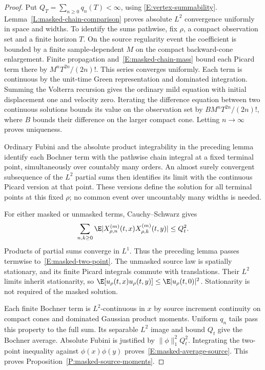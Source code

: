 \begin{proof}
  Put $Q_T=\sum_{n\ge0}q_n(T)<\infty$, using
  \eqref{E:vertex-summability}. Lemma~\ref{L:masked-chain-comparison}
  proves absolute $L^2$ convergence uniformly in space and widths.
  To identify the sums pathwise, fix $\rho$, a compact observation set
  and a finite horizon $T$. On the source regularity event the coefficient
  is bounded by a finite sample-dependent $M$ on the compact backward-cone
  enlargement. Finite propagation and~\eqref{E:masked-chain-mass} bound
  each Picard term there by $M^nT^{2n}/(2n)!$.
  This series converges uniformly. Each term is continuous by the
  unit-time Green representation and dominated integration. Summing the
  Volterra recursion gives the ordinary mild equation with initial
  displacement one and velocity zero. Iterating the difference equation
  between two continuous solutions bounds its value on the observation
  set by $B M^nT^{2n}/(2n)!$, where $B$ bounds their difference on the
  larger compact cone. Letting $n\to\infty$ proves uniqueness.

  Ordinary Fubini and the absolute product integrability in the preceding
  lemma identify each Bochner term with the pathwise chain integral at a
  fixed terminal point, simultaneously over countably many orders.
  An almost surely convergent subsequence of the $L^2$ partial sums then
  identifies its limit with the continuous Picard version at that point.
  These versions define the solution for all terminal points at this
  fixed $\rho$; no common event over uncountably many widths is needed.

  For either masked or unmasked terms, Cauchy--Schwarz gives
  \[
    \sum_{n,k\ge0}\E|X_{\rho,n}^{(m)}(t,x)
    X_{\rho,k}^{(m)}(t,y)|\le Q_t^2.
  \]
  Products of partial sums converge in $L^1$. Thus the preceding
  lemma passes termwise to~\eqref{E:masked-two-point}.
  The unmasked source law is spatially stationary, and its finite
  Picard integrals commute with translations. Their $L^2$ limits inherit
  stationarity, so
  $\E[u_\rho(t,x)u_\rho(t,y)]\le\E|u_\rho(t,0)|^2$.
  Stationarity is not required of the masked solution.

  Each finite Bochner term is $L^2$-continuous in $x$ by source increment
  continuity on compact cones and dominated Gaussian product moments.
  Uniform $q_n$ tails pass this property to the full sum. Its separable
  $L^2$ image and bound $Q_t$ give the Bochner average. Absolute Fubini
  is justified by $\|\phi\|_1^2Q_t^2$. Integrating the two-point
  inequality against $\phi(x)\phi(y)$ proves~\eqref{E:masked-average-source}.
  This proves Proposition~\ref{P:masked-source-moments}.
\end{proof}

